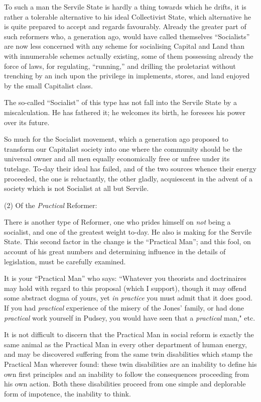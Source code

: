 \documentclass{book}
\begin{document}
To such a man the Servile State is hardly a thing towards which he drifts, it is rather a tolerable alternative to his ideal Collectivist State, which alternative he is quite prepared to accept and regards favourably. Already the greater part of such reformers who, a generation ago, would have called themselves “Socialists” are now less concerned with any scheme for socialising Capital and Land than with innumerable schemes actually existing, some of them possessing already the force of laws, for regulating, “running,” and drilling the proletariat without trenching by an inch upon the privilege in implements, stores, and land enjoyed by the small Capitalist class.

The so-called “Socialist” of this type has not fall into the Servile State by a miscalculation. He has fathered it; he welcomes its birth, he foresees his power over its future.

So much for the Socialist movement, which a generation ago proposed to transform our Capitalist society into one where the community should be the universal owner and all men equally economically free or unfree under its tutelage. To-day their ideal has failed, and of the two sources whence their energy proceeded, the one is reluctantly, the other gladly, acquiescent in the advent of a society which is not Socialist at all but Servile.

(2) Of the \emph{Practical} Reformer:

There is another type of Reformer, one who prides himself on \emph{not} being a socialist, and one of the greatest weight to-day. He also is making for the Servile State. This second factor in the change is the “Practical Man”; and this fool, on account of his great numbers and determining influence in the details of legislation, must be carefully examined.

It is your “Practical Man” who says: “Whatever you theorists and doctrinaires may hold with regard to this proposal (which I support), though it may offend some abstract dogma of yours, yet \emph{in practice} you must admit that it does good. If you had \emph{practical} experience of the misery of the Jones’ family, or had done \emph{practical} work yourself in Pudsey, you would have seen that a \emph{practical} man," etc.

It is not difficult to discern that the Practical Man in social reform is exactly the same animal as the Practical Man in every other department of human energy, and may be discovered suffering from the same twin disabilities which stamp the Practical Man wherever found: these twin disabilities are an inability to define his own first principles and an inability to follow the consequences proceeding from his own action. Both these disabilities proceed from one simple and deplorable form of impotence, the inability to think.
\end{document}

